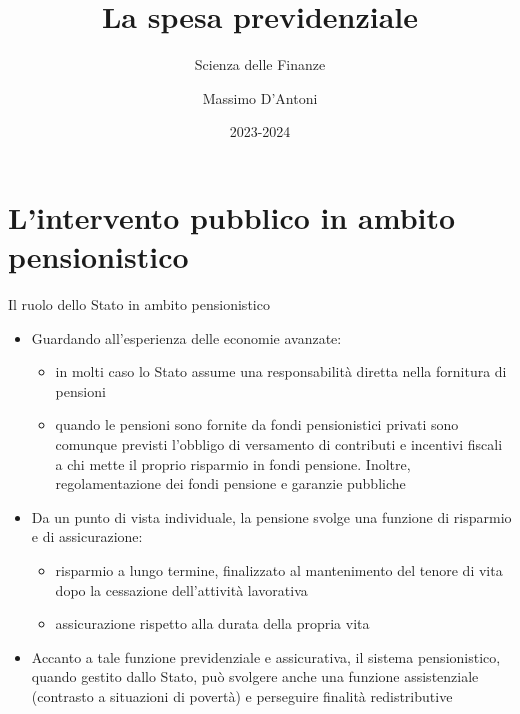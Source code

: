\documentclass[11pt]{beamer}
\institute{Università di Siena}
\author{Massimo D'Antoni}
\date{2023-2024}
\title{La spesa previdenziale}
\subtitle{Scienza delle Finanze}
\begin{document}
\maketitle

\section{L'intervento pubblico in ambito pensionistico}

\begin{frame}{Il ruolo dello Stato in ambito pensionistico}
\begin{itemize}
\item Guardando all'esperienza delle economie avanzate:
\begin{itemize}
\item in molti caso lo Stato assume una responsabilità diretta nella fornitura di
pensioni
\item quando le pensioni sono fornite da fondi pensionistici privati sono
comunque previsti l'obbligo di versamento di contributi e incentivi
fiscali a chi mette il proprio risparmio in fondi pensione. Inoltre,
regolamentazione dei fondi pensione e garanzie pubbliche
\end{itemize}

\item Da un punto di vista individuale, la pensione svolge una funzione di
\alert{risparmio} e di \alert{assicurazione}:
\begin{itemize}
\item risparmio a lungo termine, finalizzato al mantenimento del tenore di vita
dopo la cessazione dell'attività lavorativa
\item assicurazione rispetto alla durata della propria vita
\end{itemize}

\item Accanto a tale funzione \alert{previdenziale} e \alert{assicurativa}, il sistema
pensionistico, quando gestito dallo Stato, può svolgere anche una funzione
\alert{assistenziale} (contrasto a situazioni di povertà) e perseguire finalità
\alert{redistributive}
\end{itemize}
\end{frame}
\end{document}
